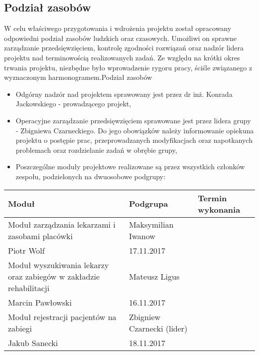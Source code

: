 \subsection{Podział zasobów}

W celu właściwego przygotowania i wdrożenia projektu został opracowany odpowiedni podział zasobów ludzkich oraz czasowych. Umożliwi on sprawne zarządzanie przedsięwzięciem, kontrolę zgodności rozwiązań oraz nadzór lidera projektu nad terminowością realizowanych zadań. Ze względu na krótki okres trwania projektu, niezbędne było wprowadzenie rygoru pracy, ściśle związanego z wyznaczonym harmonogramem.Podział zasobów

\begin{itemize}
	\item Odgórny nadzór nad projektem sprawowany jest przez dr inż. Konrada Jackowskiego - prowadzącego projekt,
	\item Operacyjne zarządzanie przedsięwzięciem sprawowane jest przez lidera grupy - Zbigniewa Czarneckiego. Do jego obowiązków należy informowanie opiekuna projektu o postępie prac, przeprowadzanych modyfikacjach oraz napotkanych problemach oraz rozdzielanie zadań w obrębie grupy,
	\item Poszczególne moduły projektowe realizowane są przez wszystkich członków zespołu, podzielonych na dwuosobowe podgrupy: 
\end{itemize}

\begin{tabularx}{\textwidth}{|l|l|l|}
	\hline
	Moduł & Podgrupa & Termin wykonania \tabularnewline \hline
	Moduł zarządzania lekarzami i zasobami placówki & Maksymilian Iwanow \\ Piotr Wolf & 17.11.2017 \tabularnewline \hline
	Moduł wyszukiwania lekarzy oraz zabiegów w zakładzie rehabilitacji & Mateusz Ligus \\ Marcin Pawłowski & 16.11.2017 \tabularnewline \hline
	Moduł rejestracji pacjentów na zabiegi & Zbigniew Czarnecki (lider) \\ Jakub Sanecki & 18.11.2017 \tabularnewline \hline
\end{tabularx}
